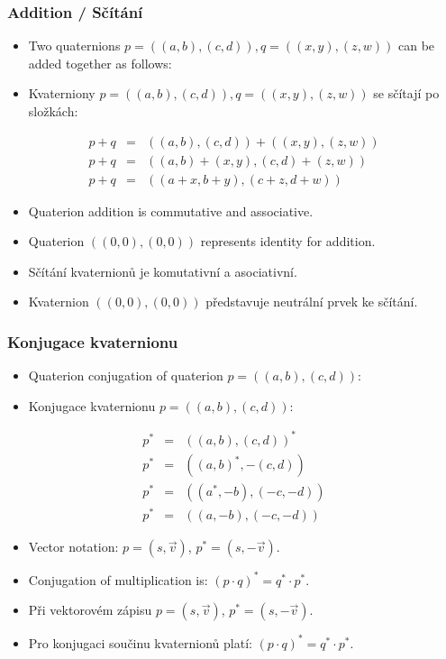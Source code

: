 \begin{frame}\frametitle{Addition / Sčítání}\scriptsize
\begin{itemize}
\item Two quaternions $p=((a,b),(c,d)),q=((x,y),(z,w))$ can be added together as follows:
\item Kvaterniony $p=((a,b),(c,d)),q=((x,y),(z,w))$ se sčítají po složkách:
\end{itemize}
\begin{eqnarray*}
p+q &=& ((a,b),(c,d))+((x,y),(z,w))\\
p+q &=& ((a,b)+(x,y),(c,d)+(z,w))\\
p+q &=& ((a+x,b+y),(c+z,d+w))
\end{eqnarray*}
\begin{itemize}
\item Quaterion addition is commutative and associative.
\item Quaterion $((0,0),(0,0))$ represents identity for addition.
\end{itemize}
\begin{itemize}
\item Sčítání kvaternionů je komutativní a asociativní.
\item Kvaternion $((0,0),(0,0))$ představuje neutrální prvek ke sčítání.
\end{itemize}
\end{frame}

\begin{frame}\frametitle{Konjugace kvaternionu}\scriptsize
\begin{itemize}
\item Quaterion conjugation of quaterion $p=((a,b),(c,d))$:
\item Konjugace kvaternionu $p=((a,b),(c,d))$:
\end{itemize}
\begin{eqnarray*}
p^* &=& ((a,b),(c,d))^*\\
p^* &=& ((a,b)^*,-(c,d))\\
p^* &=& ((a^*,-b),(-c,-d))\\
p^* &=& ((a,-b),(-c,-d))
\end{eqnarray*}
\begin{itemize}
\item Vector notation: $p=(s,\vec v)$, $p^*=(s,-\vec v)$.
\item Conjugation of multiplication is: $(p \cdot q)^*= q^* \cdot p^*$.
\end{itemize}
\begin{itemize}
\item Při vektorovém zápisu $p=(s,\vec v)$, $p^*=(s,-\vec v)$.
\item Pro konjugaci součinu kvaternionů platí: $(p \cdot q)^*= q^* \cdot p^*$.
\end{itemize}
\end{frame}

